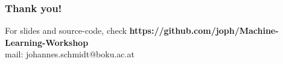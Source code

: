 \documentclass[color=usenames,dvipsnames]{beamer}
\begin{document}
{


\begin{frame}
\frametitle{Thank you!}
\begin{block}{
For slides and source-code, check \textbf{https://github.com/joph/Machine-Learning-Workshop}\\
mail: johannes.schmidt@boku.ac.at\\

}
\end{block}

\vspace{2.5 cm}


\end{frame}

}
\end{document}
